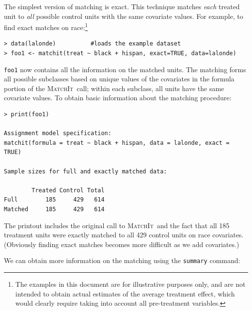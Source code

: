 \documentclass[oneside,letterpaper,titlepage]{article}
\newcommand{\MatchIt}{\textsc{MatchIt}}
\begin{document}
The simplest version of matching is exact.  This technique matches
\emph{each} treated unit to \emph{all} possible control units with the
same covariate values.  For example, to find exact matches on
race:\footnote{The examples in this document are for illustrative
  purposes only, and are not intended to obtain actual estimates of
  the average treatment effect, which would clearly require taking
  into account all pre-treatment variables.}

\begin{verbatim}
> data(lalonde)          #loads the example dataset
> foo1 <- matchit(treat ~ black + hispan, exact=TRUE, data=lalonde)
\end{verbatim}

\noindent \texttt{foo1} now contains all the information on the
matched units.  The matching forms all possible subclasses based on
unique values of the covariates in the formula portion of the
\MatchIt\ call; within each subclass, all units have the same
covariate values.  To obtain basic information about the matching
procedure:

\begin{verbatim}
> print(foo1)
 
Assignment model specification:
matchit(formula = treat ~ black + hispan, data = lalonde, exact = TRUE)
 
Sample sizes for full and exactly matched data:
 
        Treated Control Total
Full        185     429   614
Matched     185     429   614
\end{verbatim} 
The printout includes the original call to \MatchIt\ and the fact that
all 185 treatment units were exactly matched to all 429 control units
on race covariates.  (Obviously finding exact matches becomes more
difficult as we add covariates.)

We can obtain more information on the matching using the {\tt summary}
command:
\end{document}
